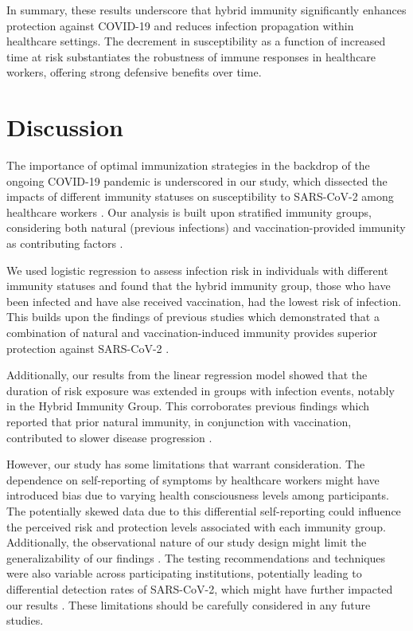 \documentclass[11pt]{article}
\begin{document}
In summary, these results underscore that hybrid immunity significantly enhances protection against COVID-19 and reduces infection propagation within healthcare settings. The decrement in susceptibility as a function of increased time at risk substantiates the robustness of immune responses in healthcare workers, offering strong defensive benefits over time.

\section*{Discussion}

The importance of optimal immunization strategies in the backdrop of the ongoing COVID-19 pandemic is underscored in our study, which dissected the impacts of different immunity statuses on susceptibility to SARS-CoV-2 among healthcare workers \cite{Zhao2020AbnormalIO, Goldberg2022ProtectionAW, Fernandes2022EmergingCV}. Our analysis is built upon stratified immunity groups, considering both natural (previous infections) and vaccination-provided immunity as contributing factors \cite{Cavanaugh2021ReducedRO,Cromer2021NeutralisingAT}.

We used logistic regression to assess infection risk in individuals with different immunity statuses and found that the hybrid immunity group, those who have been infected and have alse received vaccination, had the lowest risk of infection. This builds upon the findings of previous studies which demonstrated that a combination of natural and vaccination-induced immunity provides superior protection against SARS-CoV-2 \cite{Nordstrm2022RiskOS}. 

Additionally, our results from the linear regression model showed that the duration of risk exposure was extended in groups with infection events, notably in the Hybrid Immunity Group. This corroborates previous findings which reported that prior natural immunity, in conjunction with vaccination, contributed to slower disease progression \cite{Nunes2022SARSCoV2OS, Madison2021PsychologicalAB}.

However, our study has some limitations that warrant consideration. The dependence on self-reporting of symptoms by healthcare workers might have introduced bias due to varying health consciousness levels among participants. The potentially skewed data due to this differential self-reporting could influence the perceived risk and protection levels associated with each immunity group. Additionally, the observational nature of our study design might limit the generalizability of our findings \cite{Goldberg2021ProtectionAW}. The testing recommendations and techniques were also variable across participating institutions, potentially leading to differential detection rates of SARS-CoV-2, which might have further impacted our results \cite{Moss2022TheTC}. These limitations should be carefully considered in any future studies.
\end{document}
